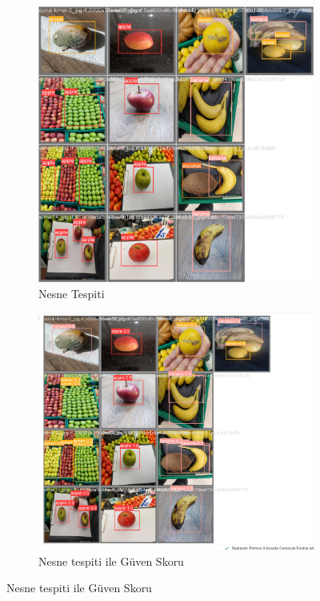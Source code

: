 \documentclass[11pt,a4paper]{report}
\begin{document}
    \begin{figure}[!h]
    	\begin{subfigure}{\textwidth}
    		\centering
    		\includegraphics[width=0.8\linewidth]{örnek1}
    		\caption{Nesne Tespiti}
    		\label{fig:ornek8}
    	\end{subfigure}
    	
    	\begin{subfigure}{\textwidth}
    		\centering
    		\includegraphics[width=0.8\linewidth]{örnek2}
    		\caption{Nesne tespiti ile Güven Skoru}
    		\label{fig:ornek9}
    	\end{subfigure}
    	
    	
    \end{figure}
    
\end{document}
